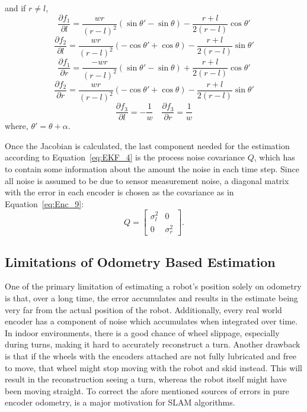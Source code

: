 and if $ r\neq l $,
		\begin{equation}
        \frac{\partial f_1}{\partial l} = \frac{wr}{(r-l)^2}(\sin\theta'-\sin\theta)-\frac{r+l}{2(r-l)}\cos\theta'
        \end{equation}
		\begin{equation}
        \frac{\partial f_2}{\partial l} = \frac{wr}{(r-l)^2}(-\cos\theta'+\cos\theta)-\frac{r+l}{2(r-l)}\sin\theta'
        \end{equation}
		\begin{equation}
        \frac{\partial f_1}{\partial r} = \frac{-wr}{(r-l)^2}(\sin\theta'-\sin\theta)+\frac{r+l}{2(r-l)}\cos\theta'
        \end{equation}
		\begin{equation}
        \frac{\partial f_2}{\partial r} = \frac{wr}{(r-l)^2}(-\cos\theta'+\cos\theta)-\frac{r+l}{2(r-l)}\sin\theta'
        \end{equation}
		\begin{equation}
        \frac{\partial f_3}{\partial l} = -\frac{1}{w} \quad \frac{\partial f_3}{\partial r} = \frac{1}{w}
        \end{equation}
where, $ \theta'=\theta+\alpha $.

Once the Jacobian is calculated, the last component needed for the estimation according to Equation~\ref{eq:EKF_4} is the process noise covariance $ Q $, which has to contain some information about the amount the noise in each time step. Since all noise is assumed to be due to sensor measurement noise, a diagonal matrix with the error in each encoder is chosen as the covariance as in Equation~\ref{eq:Enc_9}:
\begin{equation}
\label{eq:Enc_9}
Q = 
\begin{bmatrix}
\sigma_l^2 & 0\\
0 & \sigma_r^2
\end{bmatrix}.
\end{equation}

\subsection{Limitations of Odometry Based Estimation}

One of the primary limitation of estimating a robot's position solely on odometry is that, over a long time, the error accumulates and results in the estimate being very far from the actual position of the robot. Additionally, every real world encoder has a component of noise which accumulates when integrated over time. In indoor environments, there is a good chance of wheel slippage, especially during turns, making it hard to accurately reconstruct a turn. Another drawback is that if the wheels with the encoders attached are not fully lubricated and free to move, that wheel might stop moving with the robot and skid instead. This will result in the reconstruction seeing a turn, whereas the robot itself might have been moving straight. To correct the afore mentioned sources of errors in pure encoder odometry, is a major motivation for SLAM algorithms.